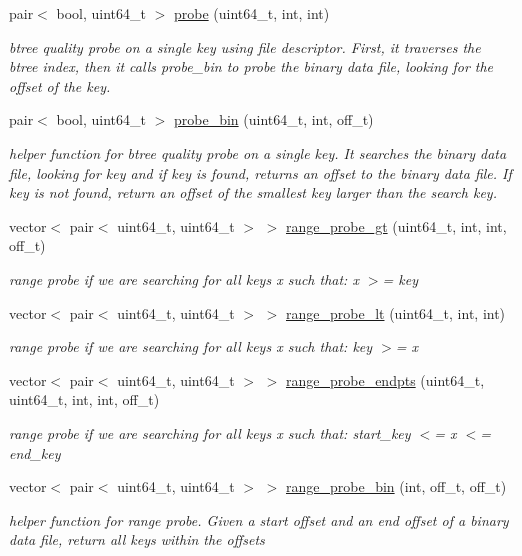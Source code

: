 \begin{DoxyCompactItemize}
\item 
pair$<$ bool, uint64\+\_\+t $>$ \hyperlink{class_b_tree_index_a5f7c70180b49b73c02352ba1135a91f7}{probe} (uint64\+\_\+t, int, int)
\begin{DoxyCompactList}\small\item\em btree quality probe on a single key using file descriptor. First, it traverses the btree index, then it calls probe\+\_\+bin to probe the binary data file, looking for the offset of the key. \end{DoxyCompactList}\item 
pair$<$ bool, uint64\+\_\+t $>$ \hyperlink{class_b_tree_index_a8a5d7a705ae4eb777695d819b88c08a4}{probe\+\_\+bin} (uint64\+\_\+t, int, off\+\_\+t)
\begin{DoxyCompactList}\small\item\em helper function for btree quality probe on a single key. It searches the binary data file, looking for key and if key is found, returns an offset to the binary data file. If key is not found, return an offset of the smallest key larger than the search key. \end{DoxyCompactList}\item 
vector$<$ pair$<$ uint64\+\_\+t, uint64\+\_\+t $>$ $>$ \hyperlink{class_b_tree_index_a212f6138db459618a7dd7e2ccc813cc3}{range\+\_\+probe\+\_\+gt} (uint64\+\_\+t, int, int, off\+\_\+t)
\begin{DoxyCompactList}\small\item\em range probe if we are searching for all keys x such that\+: x $>$= key \end{DoxyCompactList}\item 
vector$<$ pair$<$ uint64\+\_\+t, uint64\+\_\+t $>$ $>$ \hyperlink{class_b_tree_index_a648938da25539265a0c938e989076e06}{range\+\_\+probe\+\_\+lt} (uint64\+\_\+t, int, int)
\begin{DoxyCompactList}\small\item\em range probe if we are searching for all keys x such that\+: key $>$= x \end{DoxyCompactList}\item 
vector$<$ pair$<$ uint64\+\_\+t, uint64\+\_\+t $>$ $>$ \hyperlink{class_b_tree_index_acf5cdb0e95eb8472762f945ccb7ade6d}{range\+\_\+probe\+\_\+endpts} (uint64\+\_\+t, uint64\+\_\+t, int, int, off\+\_\+t)
\begin{DoxyCompactList}\small\item\em range probe if we are searching for all keys x such that\+: start\+\_\+key $<$= x $<$= end\+\_\+key \end{DoxyCompactList}\item 
vector$<$ pair$<$ uint64\+\_\+t, uint64\+\_\+t $>$ $>$ \hyperlink{class_b_tree_index_a60cebd82ad0c571732099c1d67dd2c2a}{range\+\_\+probe\+\_\+bin} (int, off\+\_\+t, off\+\_\+t)
\begin{DoxyCompactList}\small\item\em helper function for range probe. Given a start offset and an end offset of a binary data file, return all keys within the offsets \end{DoxyCompactList}\end{DoxyCompactItemize}
